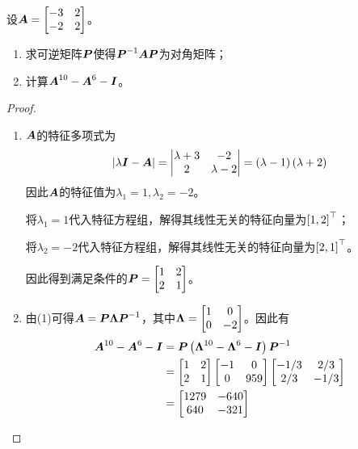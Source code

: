 \begin{problem}
设\(\boldsymbol{A}=\begin{bmatrix}-3&2\\-2&2\end{bmatrix}\)。
\begin{enumerate}
    \item 求可逆矩阵\(\boldsymbol{P}\)使得\({\boldsymbol{P}}^{-1}\boldsymbol{A}\boldsymbol{P}\)为对角矩阵；
    \item 计算\(\boldsymbol{A}^{10}-\boldsymbol{A}^6-\boldsymbol{I}\)。
\end{enumerate}
\end{problem}
\begin{proof}
    \begin{enumerate}
        \item {
              \(\boldsymbol{A}\)的特征多项式为
              \begin{equation*}
                  \left|\lambda\boldsymbol{I}-\boldsymbol{A} \right|=\begin{vmatrix}\lambda+3&-2\\2&\lambda-2\end{vmatrix}=\left( \lambda-1 \right)\left( \lambda+2 \right)
              \end{equation*}
              因此\(\boldsymbol{A}\)的特征值为\(\lambda_1=1,\lambda_2=-2\)。

              将\(\lambda_1=1\)代入特征方程组，解得其线性无关的特征向量为\(\left[ 1,2 \right]^\top\)；

              将\(\lambda_2=-2\)代入特征方程组，解得其线性无关的特征向量为\(\left[ 2,1 \right]^\top\)。

              因此得到满足条件的\(\boldsymbol{P}=\begin{bmatrix}1&2\\2&1\end{bmatrix}\)。
              }
        \item {
              由(1)可得\(\boldsymbol{A}=\boldsymbol{P}\boldsymbol{\Lambda}{\boldsymbol{P}}^{-1}\)，其中\(\boldsymbol{\Lambda}=\begin{bmatrix}1&0\\0&-2\end{bmatrix}\)。因此有
              \begin{align*}
                  \boldsymbol{A}^{10}-\boldsymbol{A}^6-\boldsymbol{I} & =\boldsymbol{P}\left( \boldsymbol{\Lambda}^{10}-\boldsymbol{\Lambda}^6-\boldsymbol{I} \right){\boldsymbol{P}}^{-1}                                                                       \\
                                           & =\begin{bmatrix}1&2\\2&1\end{bmatrix}\begin{bmatrix}-1&0\\0&959\end{bmatrix}\begin{bmatrix}-1/3&2/3\\2/3&-1/3\end{bmatrix} \\
                                           & =\begin{bmatrix}1279&-640\\640&-321\end{bmatrix}
              \end{align*}
              }
    \end{enumerate}
\end{proof}

